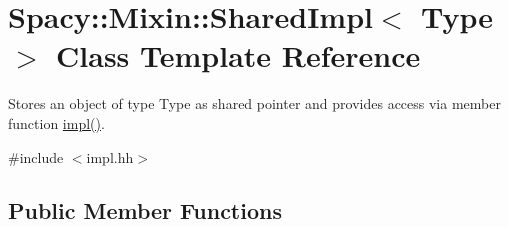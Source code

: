 \hypertarget{classSpacy_1_1Mixin_1_1SharedImpl}{}\section{Spacy\+:\+:Mixin\+:\+:Shared\+Impl$<$ Type $>$ Class Template Reference}
\label{classSpacy_1_1Mixin_1_1SharedImpl}


Stores an object of type Type as shared pointer and provides access via member function \hyperlink{classSpacy_1_1Mixin_1_1SharedImpl_a4bed4faca68901d0dd463c4234fb2fe6}{impl()}.  




{\ttfamily \#include $<$impl.\+hh$>$}

\subsection*{Public Member Functions}
